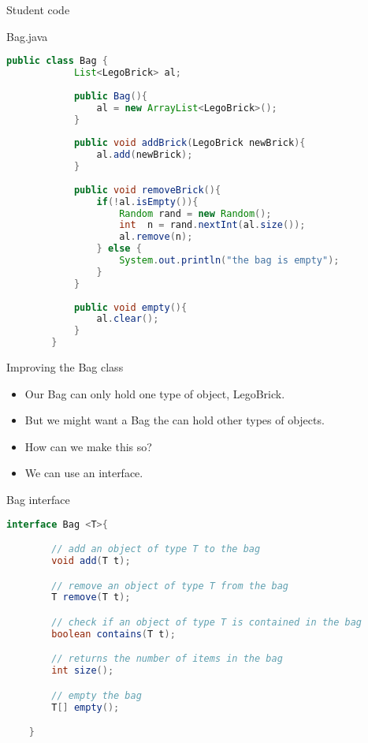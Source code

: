 \documentclass[pdf]{beamer}
\begin{document}
\begin{frame}[fragile]{Student code}
    \begin{block}{Bag.java}
    \begin{lstlisting}[language=Java,basicstyle=\ttfamily\tiny,keywordstyle=\color{blue}]
        public class Bag {
            List<LegoBrick> al;
        
            public Bag(){
                al = new ArrayList<LegoBrick>();    
            }
        
            public void addBrick(LegoBrick newBrick){
                al.add(newBrick);
            }
        
            public void removeBrick(){
                if(!al.isEmpty()){
                    Random rand = new Random();
                    int  n = rand.nextInt(al.size());
                    al.remove(n);
                } else {
                    System.out.println("the bag is empty");
                }
            }
        
            public void empty(){
                al.clear();
            }
        }
    \end{lstlisting}
\end{block}
\end{frame}

\begin{frame}{Improving the Bag class}
    \begin{itemize}
        \item<1-2> Our Bag can only hold one type of object, LegoBrick.
        \item<1-2> But we might want a Bag the can hold other types of objects.
        \item<1-2> How can we make this so?
        \item<2> We can use an interface.
    \end{itemize}
\end{frame}

\begin{frame}[fragile]{Bag interface}
    \begin{lstlisting}[language=Java,basicstyle=\ttfamily\tiny,keywordstyle=\color{blue}]
    interface Bag <T>{

        // add an object of type T to the bag
        void add(T t);

        // remove an object of type T from the bag
        T remove(T t);

        // check if an object of type T is contained in the bag
        boolean contains(T t);

        // returns the number of items in the bag
        int size();

        // empty the bag
        T[] empty();

    }
    \end{lstlisting}

\end{frame}
\end{document}

